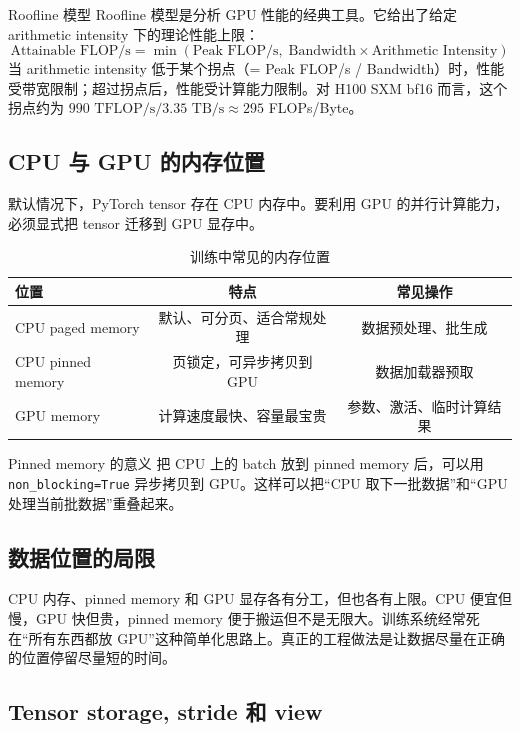 \documentclass[a4paper]{article}
\begin{document}
\begin{knowledgebox}{Roofline 模型}
Roofline 模型是分析 GPU 性能的经典工具。它给出了给定 arithmetic intensity 下的理论性能上限：
$$
\text{Attainable FLOP/s} = \min\left(\text{Peak FLOP/s},\;\text{Bandwidth} \times \text{Arithmetic Intensity}\right)
$$
当 arithmetic intensity 低于某个拐点（= Peak FLOP/s / Bandwidth）时，性能受带宽限制；超过拐点后，性能受计算能力限制。对 H100 SXM bf16 而言，这个拐点约为 $990 \text{ TFLOP/s} / 3.35 \text{ TB/s} \approx 295$ FLOPs/Byte。
\end{knowledgebox}

\subsection{CPU 与 GPU 的内存位置}

默认情况下，PyTorch tensor 存在 CPU 内存中。要利用 GPU 的并行计算能力，必须显式把 tensor 迁移到 GPU 显存中。

\begin{table}[H]
\centering
\begin{tabular}{lcc}
\toprule
\textbf{位置} & \textbf{特点} & \textbf{常见操作} \\
\midrule
CPU paged memory & 默认、可分页、适合常规处理 & 数据预处理、批生成 \\
CPU pinned memory & 页锁定，可异步拷贝到 GPU & 数据加载器预取 \\
GPU memory & 计算速度最快、容量最宝贵 & 参数、激活、临时计算结果 \\
\bottomrule
\end{tabular}
\caption{训练中常见的内存位置}
\end{table}

\begin{knowledgebox}{Pinned memory 的意义}
把 CPU 上的 batch 放到 pinned memory 后，可以用 \texttt{non\_blocking=True} 异步拷贝到 GPU。这样可以把“CPU 取下一批数据”和“GPU 处理当前批数据”重叠起来。
\end{knowledgebox}

\subsection{数据位置的局限}

CPU 内存、pinned memory 和 GPU 显存各有分工，但也各有上限。CPU 便宜但慢，GPU 快但贵，pinned memory 便于搬运但不是无限大。训练系统经常死在“所有东西都放 GPU”这种简单化思路上。真正的工程做法是让数据尽量在正确的位置停留尽量短的时间。

\subsection{Tensor storage, stride 和 view}
\end{document}
